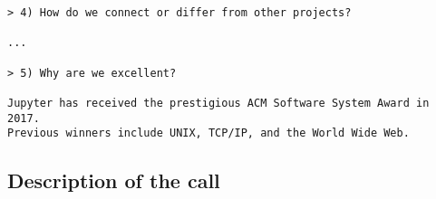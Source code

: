 \begin{draft}
\begin{verbatim}
> 4) How do we connect or differ from other projects?

...

> 5) Why are we excellent?

Jupyter has received the prestigious ACM Software System Award in 2017.
Previous winners include UNIX, TCP/IP, and the World Wide Web.

\end{verbatim}





\subsection*{Description of the call}

% 


\renewcommand{\thepage}{\arabic{page}}
\setcounter{page}{1}
\black
\cleardoublepage
\end{draft}


